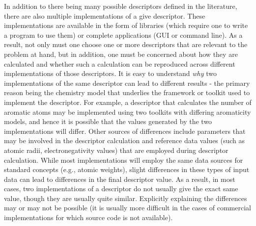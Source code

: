 \documentclass[letterpaper, 12pt]{article}
\begin{document}
In addition to there being many possible descriptors defined in the
literature, there are also multiple implementations of a give
descriptor. These implementations are available in the form of
libraries (which require one to write a program to use them) or
complete applications (GUI or command line). As a result, not only
must one choose one or more descriptors that are relevant to the
problem at hand, but in addition, one must be concerned about how they
are calculated and whether such a calculation can be reproduced across
different implementations of those descriptors. It is easy to
understand \emph{why} two implementations of the same descriptor can
lead to different results - the primary reason being the chemistry
model that underlies the framework or toolkit used to implement the
descriptor. For example, a descriptor that calculates the number of
aromatic atoms may be implemented using two toolkits with differing
aromaticity models, and hence it is possible that the values generated
by the two implementations will differ. Other sources of differences
include parameters that may be involved in the descriptor calculation
and reference data values (such as atomic radii, electronegativity
values) that are employed during descriptor calculation. While most
implementations will employ the same data sources for standard
concepts (e.g., atomic weights), slight differences in these types of
input data can lead to differences in the final descriptor value. As a
result, in most cases, two implementations of a descriptor do not
usually give the exact same value, though they are usually quite
similar. Explicitly explaining the differences may or may not be
possible (it is usually more difficult in the cases of commercial
implementations for which source code is not available).
\end{document}

